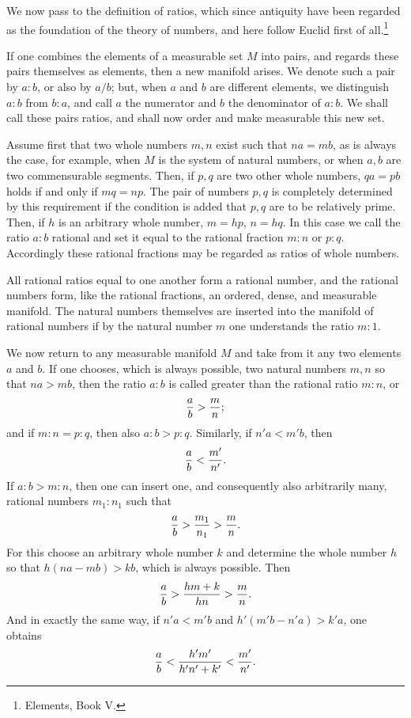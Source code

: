 \documentclass[11pt]{article}
\begin{document}
We now pass to the definition of ratios, which since antiquity have been regarded as the foundation of the theory of numbers, and here follow Euclid first of all.\footnote{Elements, Book V.}

If one combines the elements of a measurable set $M$ into pairs, and regards these pairs themselves as elements, then a new manifold arises. We denote such a pair by $a:b$, or also by $a/b$; but, when $a$ and $b$ are different elements, we distinguish $a:b$ from $b:a$, and call $a$ the numerator and $b$ the denominator of $a:b$. We shall call these pairs ratios, and shall now order and make measurable this new set.

Assume first that two whole numbers $m,n$ exist such that $na=mb$, as is always the case, for example, when $M$ is the system of natural numbers, or when $a,b$ are two commensurable segments. Then, if $p,q$ are two other whole numbers, $qa=pb$ holds if and only if $mq=np$. The pair of numbers $p,q$ is completely determined by this requirement if the condition is added that $p,q$ are to be relatively prime. Then, if $h$ is an arbitrary whole number, $m=hp$, $n=hq$. In this case we call the ratio $a:b$ rational and set it equal to the rational fraction $m:n$ or $p:q$. Accordingly these rational fractions may be regarded as ratios of whole numbers.

All rational ratios equal to one another form a rational number, and the rational numbers form, like the rational fractions, an ordered, dense, and measurable manifold. The natural numbers themselves are inserted into the manifold of rational numbers if by the natural number $m$ one understands the ratio $m:1$.

We now return to any measurable manifold $M$ and take from it any two elements $a$ and $b$. If one chooses, which is always possible, two natural numbers $m,n$ so that $na>mb$, then the ratio $a:b$ is called greater than the rational ratio $m:n$, or
\[
 {a\over b}>{m\over n};
\]
and if $m:n=p:q$, then also $a:b>p:q$. Similarly, if $n'a<m'b$, then
\[
 {a\over b}<{m'\over n'}.
\]
If $a:b>m:n$, then one can insert one, and consequently also arbitrarily many, rational numbers $m_1:n_1$ such that
\[
 {a\over b}>{m_1\over n_1}>{m\over n}.
\]
For this choose an arbitrary whole number $k$ and determine the whole number $h$ so that $h(na-mb)>kb$, which is always possible. Then
\[
 {a\over b}>{hm+k\over hn}>{m\over n}.
\]
And in exactly the same way, if $n'a<m'b$ and $h'(m'b-n'a)>k'a$, one obtains
\[
 {a\over b}<{h'm'
\over h'n'+k'}<{m'
\over n'}.
\]
\end{document}
